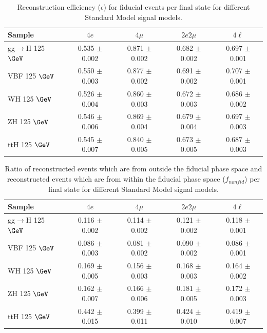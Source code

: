  \begin{table}[!h!tb]
\begin{center}
\small
\caption{
Reconstruction efficiency ($\epsilon$) for fiducial events per final state for different Standard Model signal models.
\label{tab:efficiencySM_Run2}
}
\begin{tabular}{|l|c|c|c|c|} \hline
Sample & $4e$ & $4\mu$ & $2e2\mu$ & $4\ell$ \\ \hline
gg$\rightarrow$H 125 $\GeV$ & 0.535 $\pm$ 0.002 & 0.871 $\pm$ 0.002 & 0.682 $\pm$ 0.002 & 0.697 $\pm$ 0.001 \\
VBF 125 $\GeV$ & 0.550 $\pm$ 0.003 & 0.877 $\pm$ 0.002 & 0.691 $\pm$ 0.002 & 0.707 $\pm$ 0.001 \\
WH 125 $\GeV$ & 0.526 $\pm$ 0.004 & 0.860 $\pm$ 0.003 & 0.672 $\pm$ 0.003 & 0.686 $\pm$ 0.002 \\
ZH 125 $\GeV$ & 0.546 $\pm$ 0.006 & 0.869 $\pm$ 0.004 & 0.679 $\pm$ 0.004 & 0.697 $\pm$ 0.003 \\
ttH 125 $\GeV$ & 0.545 $\pm$ 0.007 & 0.840 $\pm$ 0.005 & 0.673 $\pm$ 0.005 & 0.687 $\pm$ 0.003 \\

\hline
\end{tabular}
\normalsize
\end{center}
\end{table}
\begin{table}[!h!tb]
\begin{center}
\small
\caption{
Ratio of reconstructed events which are from outside the fiducial phase space and reconstructed events which are from within the fiducial phase space ($f_{nonfid}$) per final state for different Standard Model signal models.
\label{tab:foutSM_Run2}
}
\begin{tabular}{|l|c|c|c|c|} \hline
Sample & $4e$ & $4\mu$ & $2e2\mu$ & $4\ell$ \\ \hline
gg$\rightarrow$H 125 $\GeV$ & 0.116 $\pm$ 0.002 & 0.114 $\pm$ 0.002 & 0.121 $\pm$ 0.002 & 0.118 $\pm$ 0.001 \\
VBF 125 $\GeV$ & 0.086 $\pm$ 0.003 & 0.081 $\pm$ 0.002 & 0.090 $\pm$ 0.002 & 0.086 $\pm$ 0.001 \\
WH 125 $\GeV$ & 0.169 $\pm$ 0.005 & 0.156 $\pm$ 0.003 & 0.168 $\pm$ 0.003 & 0.164 $\pm$ 0.002 \\
ZH 125 $\GeV$ & 0.162 $\pm$ 0.007 & 0.166 $\pm$ 0.006 & 0.181 $\pm$ 0.005 & 0.172 $\pm$ 0.003 \\
ttH 125 $\GeV$ & 0.442 $\pm$ 0.015 & 0.399 $\pm$ 0.011 & 0.424 $\pm$ 0.010 & 0.419 $\pm$ 0.007 \\

\hline
\end{tabular}
\normalsize
\end{center}
\end{table}


